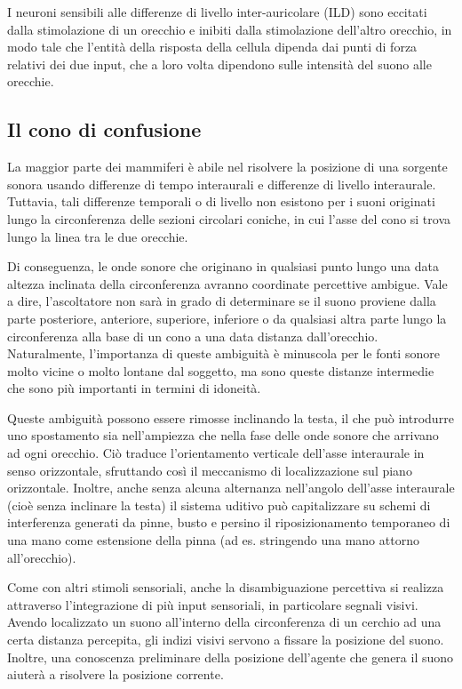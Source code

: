 I neuroni sensibili alle differenze di livello inter-auricolare (ILD) sono
eccitati dalla stimolazione di un orecchio e inibiti dalla stimolazione dell'altro
orecchio, in modo tale che l'entità della risposta della cellula dipenda dai
punti di forza relativi dei due input, che a loro volta dipendono sulle intensità
del suono alle orecchie.

\subsection{Il cono di confusione}

La maggior parte dei mammiferi è abile nel risolvere la posizione di una sorgente
sonora usando differenze di tempo interaurali e differenze di livello interaurale.
Tuttavia, tali differenze temporali o di livello non esistono per i suoni originati
lungo la circonferenza delle sezioni circolari coniche, in cui l'asse del cono
si trova lungo la linea tra le due orecchie.

Di conseguenza, le onde sonore che originano in qualsiasi punto lungo una data
altezza inclinata della circonferenza avranno coordinate percettive ambigue.
Vale a dire, l'ascoltatore non sarà in grado di determinare se il suono proviene
dalla parte posteriore, anteriore, superiore, inferiore o da qualsiasi altra
parte lungo la circonferenza alla base di un cono a una data distanza dall'orecchio.
Naturalmente, l'importanza di queste ambiguità è minuscola per le fonti sonore
molto vicine o molto lontane dal soggetto, ma sono queste distanze intermedie che
sono più importanti in termini di idoneità.

Queste ambiguità possono essere rimosse inclinando la testa, il che può introdurre
uno spostamento sia nell'ampiezza che nella fase delle onde sonore che arrivano
ad ogni orecchio. Ciò traduce l'orientamento verticale dell'asse interaurale in
senso orizzontale, sfruttando così il meccanismo di localizzazione sul piano
orizzontale. Inoltre, anche senza alcuna alternanza nell'angolo dell'asse
interaurale (cioè senza inclinare la testa) il sistema uditivo può capitalizzare
su schemi di interferenza generati da pinne, busto e persino il riposizionamento
temporaneo di una mano come estensione della pinna (ad es. stringendo una mano
attorno all'orecchio).

Come con altri stimoli sensoriali, anche la disambiguazione percettiva si realizza
attraverso l'integrazione di più input sensoriali, in particolare segnali visivi.
Avendo localizzato un suono all'interno della circonferenza di un cerchio ad una
certa distanza percepita, gli indizi visivi servono a fissare la posizione del
suono. Inoltre, una conoscenza preliminare della posizione dell'agente che genera
il suono aiuterà a risolvere la posizione corrente.

